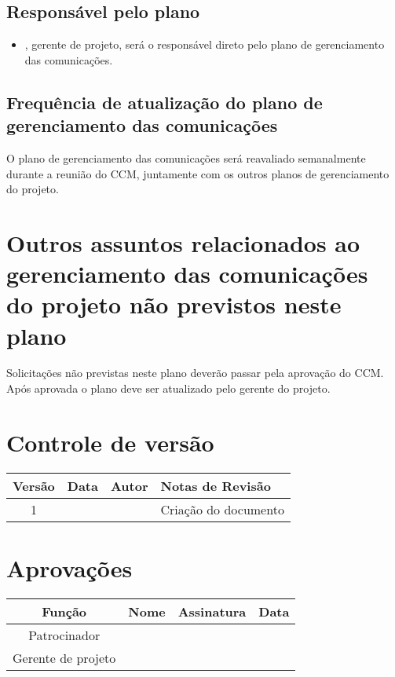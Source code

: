 \subsection{Responsável pelo plano}

\begin{itemize}
	\item \projectManagerName{}, gerente de projeto, será o responsável direto pelo plano de gerenciamento das comunicações.
\end{itemize}

\subsection{Frequência de atualização do plano de gerenciamento das comunicações}

O plano de gerenciamento das comunicações será reavaliado semanalmente durante a reunião do CCM, juntamente com os outros planos de gerenciamento do projeto.

\section{Outros assuntos relacionados ao gerenciamento das comunicações do projeto não previstos neste plano}

Solicitações não previstas neste plano deverão passar pela aprovação do CCM. Após aprovada o plano deve ser atualizado pelo gerente do projeto.

\section{Controle de versão}

\begin{table}[H]
	\begin{tabularx}{\textwidth}{| c | c | X | X |}
		\hline
		\textbf{Versão} & \textbf{Data} & \textbf{Autor}        & \textbf{Notas de Revisão} \\
		\hline
		1                &               & \projectManagerName{} & Criação do documento     \\
		\hline
	\end{tabularx}
	\centering
\end{table}

\section{Aprovações}

\begin{table}[H]
	\begin{tabularx}{\textwidth}{| c | c | X | c |}
		\hline
		\textbf{Função}  & \textbf{Nome}         & \textbf{Assinatura}        & \textbf{Data} \\
		\hline
		Patrocinador       & \projectSponsorName{} & \projectSponsorSignature{} &               \\
		\hline
		Gerente de projeto & \projectManagerName{} & \projectManagerSignature{} &               \\
		\hline
	\end{tabularx}
	\centering
\end{table}
